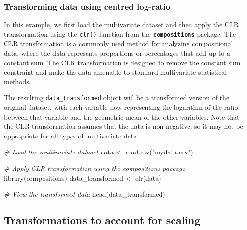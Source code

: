 \documentclass[
]{book}
\newenvironment{Shaded}{\begin{snugshade}}{\end{snugshade}}
\newcommand{\CommentTok}[1]{\textcolor[rgb]{0.56,0.35,0.01}{\textit{#1}}}
\newcommand{\FunctionTok}[1]{\textcolor[rgb]{0.00,0.00,0.00}{#1}}
\newcommand{\NormalTok}[1]{#1}
\newcommand{\OtherTok}[1]{\textcolor[rgb]{0.56,0.35,0.01}{#1}}
\newcommand{\StringTok}[1]{\textcolor[rgb]{0.31,0.60,0.02}{#1}}
\begin{document}
\hypertarget{transforming-data-using-centred-log-ratio}{%
\subsubsection*{Transforming data using centred log-ratio}\label{transforming-data-using-centred-log-ratio}}

In this example, we first load the multivariate dataset and then apply the CLR transformation using the \texttt{clr()} function from the \textbf{\texttt{compositions}} package. The CLR transformation is a commonly used method for analyzing compositional data, where the data represents proportions or percentages that add up to a constant sum. The CLR transformation is designed to remove the constant sum constraint and make the data amenable to standard multivariate statistical methods.

The resulting \texttt{data\_transformed} object will be a transformed version of the original dataset, with each variable now representing the logarithm of the ratio between that variable and the geometric mean of the other variables. Note that the CLR transformation assumes that the data is non-negative, so it may not be appropriate for all types of multivariate data.

\small

\begin{Shaded}
\begin{Highlighting}[]
\CommentTok{\# Load the multivariate dataset}
\NormalTok{data }\OtherTok{\textless{}{-}} \FunctionTok{read.csv}\NormalTok{(}\StringTok{"mydata.csv"}\NormalTok{)}

\CommentTok{\# Apply CLR transformation using the compositions package}
\FunctionTok{library}\NormalTok{(compositions)}
\NormalTok{data\_transformed }\OtherTok{\textless{}{-}} \FunctionTok{clr}\NormalTok{(data)}

\CommentTok{\# View the transformed data}
\FunctionTok{head}\NormalTok{(data\_transformed)}
\end{Highlighting}
\end{Shaded}

\normalsize

\hypertarget{data-transformation-scaling}{%
\subsection{Transformations to account for scaling}\label{data-transformation-scaling}}
\end{document}
